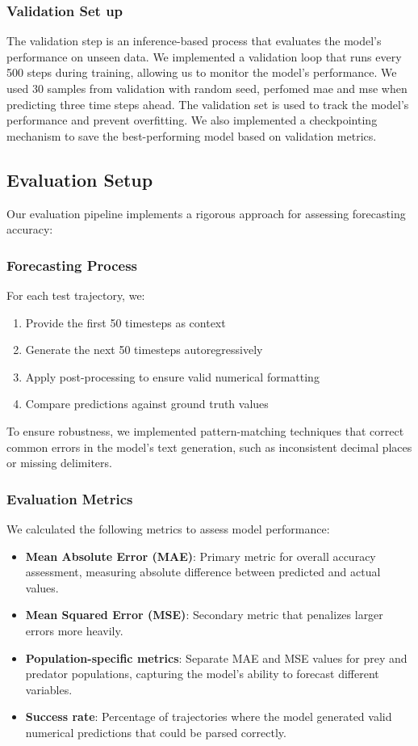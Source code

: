 \documentclass{article}
\begin{document}
\subsubsection*{Validation Set up}
The validation step is an inference-based process that evaluates the model's performance on unseen data. We implemented a validation loop that runs every 500 steps during training, allowing us to monitor the model's performance. We used 30 samples from validation with random seed, perfomed mae and mse when predicting three time steps ahead. The validation set is used to track the model's performance and prevent overfitting. We also implemented a checkpointing mechanism to save the best-performing model based on validation metrics. 


\subsection*{Evaluation Setup}
Our evaluation pipeline implements a rigorous approach for assessing forecasting accuracy:
\subsubsection*{Forecasting Process}

For each test trajectory, we:
\begin{enumerate}
    \item Provide the first 50 timesteps as context
    \item Generate the next 50 timesteps autoregressively
    \item Apply post-processing to ensure valid numerical formatting
    \item Compare predictions against ground truth values
\end{enumerate}

To ensure robustness, we implemented pattern-matching techniques that correct common errors in the model's text generation, such as inconsistent decimal places or missing delimiters.

\subsubsection*{Evaluation Metrics}

We calculated the following metrics to assess model performance:

\begin{itemize}
    \item \textbf{Mean Absolute Error (MAE)}: Primary metric for overall accuracy assessment, measuring absolute difference between predicted and actual values.
    \item \textbf{Mean Squared Error (MSE)}: Secondary metric that penalizes larger errors more heavily. 
    \item \textbf{Population-specific metrics}: Separate MAE and MSE values for prey and predator populations, capturing the model's ability to forecast different variables.
    \item \textbf{Success rate}: Percentage of trajectories where the model generated valid numerical predictions that could be parsed correctly.
\end{itemize}
\end{document}
